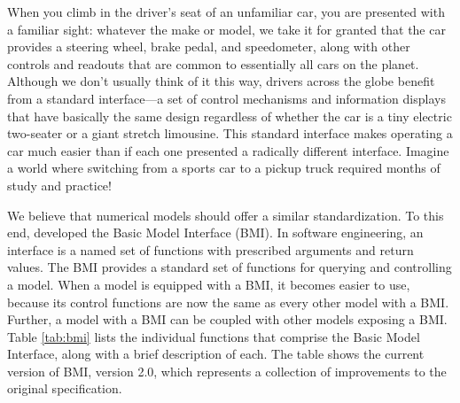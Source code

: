 \documentclass[12pt]{amsart}
\begin{document}
When you climb in the driver's seat of an unfamiliar car,
you are presented with a familiar sight:
whatever the make or model,
we take it for granted that the car provides
a steering wheel, brake pedal, and speedometer,
along with other controls and readouts
that are common to essentially all cars on the planet.
Although we don't usually think of it this way,
drivers across the globe benefit
from a standard interface---a set of control mechanisms and information displays
that have basically the same design
regardless of whether the car
is a tiny electric two-seater or a giant stretch limousine.
This standard interface makes operating a car much easier
than if each one presented a radically different interface.
Imagine a world where switching from a sports car to a pickup truck
required months of study and practice!

We believe that numerical models should offer a similar standardization.
To this end,
\cite{peckham2013component} developed the Basic Model Interface (BMI).
In software engineering,
an interface is a named set of functions
with prescribed arguments and return values.
The BMI provides a standard set of functions
for querying and controlling a model.
When a model is equipped with a BMI,
it becomes easier to use,
because its control functions are now the same as every other model with a BMI.
Further, a model with a BMI can be coupled with other models exposing a BMI.
Table \ref{tab:bmi} lists the individual functions
that comprise the Basic Model Interface,
along with a brief description of each.
The table shows the current version of BMI, version 2.0,
which represents a collection of improvements
to the original specification.
\end{document}
